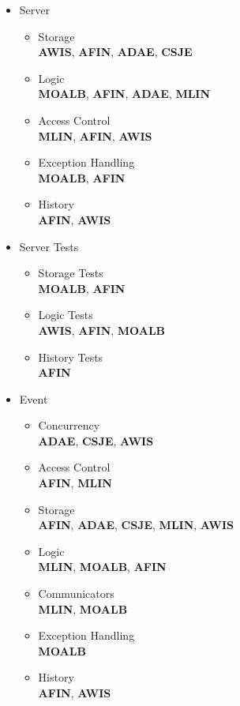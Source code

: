 \begin{itemize}
	\item Server
	\begin{itemize}
		\item Storage\\
		\textbf{AWIS}, \textbf{AFIN}, \textbf{ADAE}, \textbf{CSJE}
		\item Logic\\
		\textbf{MOALB}, \textbf{AFIN}, \textbf{ADAE}, \textbf{MLIN} 
		\item Access Control\\
		\textbf{MLIN}, \textbf{AFIN}, \textbf{AWIS}
		\item Exception Handling\\
		\textbf{MOALB}, \textbf{AFIN}
		\item History\\
		\textbf{AFIN}, \textbf{AWIS}
	\end{itemize}
	\item Server Tests
	\begin{itemize}
		\item Storage Tests\\
		\textbf{MOALB}, \textbf{AFIN}
		\item Logic Tests\\
		\textbf{AWIS}, \textbf{AFIN}, \textbf{MOALB}
		\item History Tests\\
		\textbf{AFIN}
	\end{itemize}
	\item Event
	\begin{itemize}
		\item Concurrency\\
		\textbf{ADAE}, \textbf{CSJE}, \textbf{AWIS}
		\item Access Control\\
		\textbf{AFIN}, \textbf{MLIN}
		\item Storage\\
		\textbf{AFIN}, \textbf{ADAE}, \textbf{CSJE}, \textbf{MLIN}, \textbf{AWIS}
		\item Logic\\
		\textbf{MLIN}, \textbf{MOALB}, \textbf{AFIN} 
		\item Communicators\\
		\textbf{MLIN}, \textbf{MOALB}
		\item Exception Handling\\
		\textbf{MOALB}
		\item History\\
		\textbf{AFIN}, \textbf{AWIS}
	\end{itemize}

\end{itemize}
